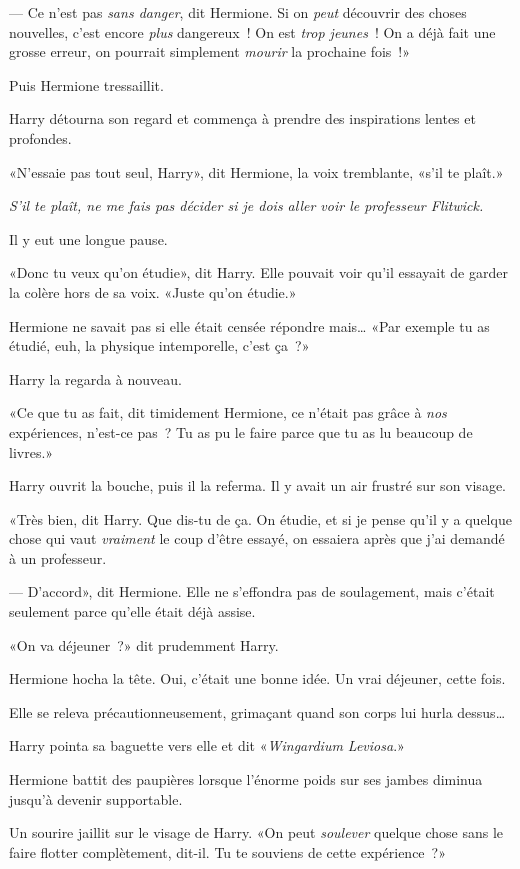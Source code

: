 --- Ce n'est pas \emph{sans danger}, dit Hermione. Si on \emph{peut} découvrir des choses nouvelles, c'est encore \emph{plus} dangereux~! On est \emph{trop jeunes}~! On a déjà fait une grosse erreur, on pourrait simplement \emph{mourir} la prochaine fois~!»

Puis Hermione tressaillit.

Harry détourna son regard et commença à prendre des inspirations lentes et profondes.

«N'essaie pas tout seul, Harry», dit Hermione, la voix tremblante, «s'il te plaît.»

\emph{S'il te plaît, ne me fais pas décider si je dois aller voir le professeur Flitwick.}

Il y eut une longue pause.

«Donc tu veux qu'on étudie», dit Harry. Elle pouvait voir qu'il essayait de garder la colère hors de sa voix. «Juste qu'on étudie.»

Hermione ne savait pas si elle était censée répondre mais… «Par exemple tu as étudié, euh, la physique intemporelle, c'est ça~?»

Harry la regarda à nouveau.

«Ce que tu as fait, dit timidement Hermione, ce n'était pas grâce à \emph{nos} expériences, n'est-ce pas~? Tu as pu le faire parce que tu as lu beaucoup de livres.»

Harry ouvrit la bouche, puis il la referma. Il y avait un air frustré sur son visage.

«Très bien, dit Harry. Que dis-tu de ça. On étudie, et si je pense qu'il y a quelque chose qui vaut \emph{vraiment} le coup d'être essayé, on essaiera après que j'ai demandé à un professeur.

--- D'accord», dit Hermione. Elle ne s'effondra pas de soulagement, mais c'était seulement parce qu'elle était déjà assise.

«On va déjeuner~?» dit prudemment Harry.

Hermione hocha la tête. Oui, c'était une bonne idée. Un vrai déjeuner, cette fois.

Elle se releva précautionneusement, grimaçant quand son corps lui hurla dessus…

Harry pointa sa baguette vers elle et dit «\emph{Wingardium Leviosa}.»

Hermione battit des paupières lorsque l'énorme poids sur ses jambes diminua jusqu'à devenir supportable.

Un sourire jaillit sur le visage de Harry. «On peut \emph{soulever} quelque chose sans le faire flotter complètement, dit-il. Tu te souviens de cette expérience~?»

